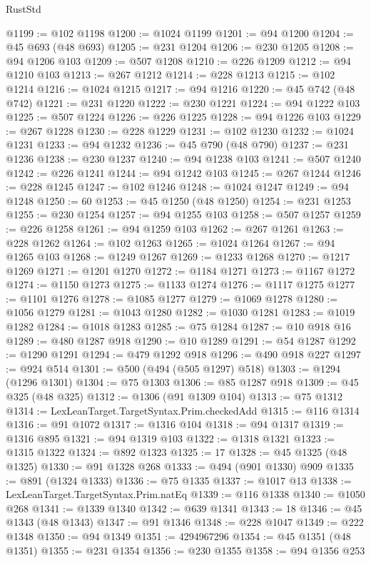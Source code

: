 \begin{lexlean}{RustStd}
\begin{coremodule}
@1199 := @102 @1198
@1200 := @1024 @1199
@1201 := @94 @1200
@1204 := @45 @693 (@48 @693)
@1205 := @231 @1204
@1206 := @230 @1205
@1208 := @94 @1206 @103
@1209 := @507 @1208
@1210 := @226 @1209
@1212 := @94 @1210 @103
@1213 := @267 @1212
@1214 := @228 @1213
@1215 := @102 @1214
@1216 := @1024 @1215
@1217 := @94 @1216
@1220 := @45 @742 (@48 @742)
@1221 := @231 @1220
@1222 := @230 @1221
@1224 := @94 @1222 @103
@1225 := @507 @1224
@1226 := @226 @1225
@1228 := @94 @1226 @103
@1229 := @267 @1228
@1230 := @228 @1229
@1231 := @102 @1230
@1232 := @1024 @1231
@1233 := @94 @1232
@1236 := @45 @790 (@48 @790)
@1237 := @231 @1236
@1238 := @230 @1237
@1240 := @94 @1238 @103
@1241 := @507 @1240
@1242 := @226 @1241
@1244 := @94 @1242 @103
@1245 := @267 @1244
@1246 := @228 @1245
@1247 := @102 @1246
@1248 := @1024 @1247
@1249 := @94 @1248
@1250 := 60
@1253 := @45 @1250 (@48 @1250)
@1254 := @231 @1253
@1255 := @230 @1254
@1257 := @94 @1255 @103
@1258 := @507 @1257
@1259 := @226 @1258
@1261 := @94 @1259 @103
@1262 := @267 @1261
@1263 := @228 @1262
@1264 := @102 @1263
@1265 := @1024 @1264
@1267 := @94 @1265 @103
@1268 := @1249 @1267
@1269 := @1233 @1268
@1270 := @1217 @1269
@1271 := @1201 @1270
@1272 := @1184 @1271
@1273 := @1167 @1272
@1274 := @1150 @1273
@1275 := @1133 @1274
@1276 := @1117 @1275
@1277 := @1101 @1276
@1278 := @1085 @1277
@1279 := @1069 @1278
@1280 := @1056 @1279
@1281 := @1043 @1280
@1282 := @1030 @1281
@1283 := @1019 @1282
@1284 := @1018 @1283
@1285 := @75 @1284
@1287 := @10 @918 @16
@1289 := @480 @1287 @918
@1290 := @10 @1289
@1291 := @54 @1287
@1292 := @1290 @1291
@1294 := @479 @1292 @918
@1296 := @490 @918 @227
@1297 := @924 @514
@1301 := @500 (@494 (@505 @1297) @518)
@1303 := @1294 (@1296 @1301)
@1304 := @75 @1303
@1306 := @85 @1287 @918
@1309 := @45 @325 (@48 @325)
@1312 := @1306 (@91 @1309 @104)
@1313 := @75 @1312
@1314 := LexLeanTarget.TargetSyntax.Prim.checkedAdd
@1315 := @116 @1314
@1316 := @91 @1072
@1317 := @1316 @104
@1318 := @94 @1317
@1319 := @1316 @895
@1321 := @94 @1319 @103
@1322 := @1318 @1321
@1323 := @1315 @1322
@1324 := @892 @1323
@1325 := 17
@1328 := @45 @1325 (@48 @1325)
@1330 := @91 @1328 @268
@1333 := @494 (@901 @1330) @909
@1335 := @891 (@1324 @1333)
@1336 := @75 @1335
@1337 := @1017 @13
@1338 := LexLeanTarget.TargetSyntax.Prim.natEq
@1339 := @116 @1338
@1340 := @1050 @268
@1341 := @1339 @1340
@1342 := @639 @1341
@1343 := 18
@1346 := @45 @1343 (@48 @1343)
@1347 := @91 @1346
@1348 := @228 @1047
@1349 := @222 @1348
@1350 := @94 @1349
@1351 := 4294967296
@1354 := @45 @1351 (@48 @1351)
@1355 := @231 @1354
@1356 := @230 @1355
@1358 := @94 @1356 @253

\end{coremodule}
\end{lexlean}
